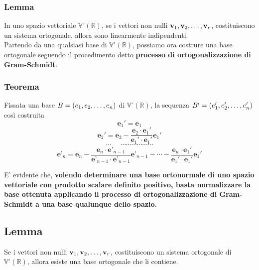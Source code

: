 \documentclass[../main.tex]{subfiles}
\begin{document}
\subsubsection{Lemma}
In uno spazio vettoriale $\mathbb{V}^{\circ}(\mathbb{R})$, se i vettori non
nulli $\textbf{v}_1, \textbf{v}_2, \ldots, \textbf{v}_{r}$, costituiscono un sistema ortogonale, allora sono
linearmente indipendenti.\\ Partendo da una qualsiasi base di
$\mathbb{V}^{\circ}(\mathbb{R})$, possiamo ora costrure una base ortogonale
seguendo il procedimento detto \textbf{processo di ortogonalizzazione di
    Gram-Schmidt}.\\

\subsubsection{Teorema}
Fissata una base $B = (e_1, e_2, \ldots, e_{n})$ di $\mathbb{V}^{\circ}(\mathbb{R})$, la
sequenza $B' = (e'_1, e'_2, \ldots, e'_{n})$ così costruita
\[
    \textbf{e}_1' = \textbf{e}_1
\]
\[
    \textbf{e}_2' = \textbf{e}_2 - \dfrac{\textbf{e}_2\cdot\textbf{e}_1'}{\textbf{e}_1'\cdot\textbf{e}_1'}\textbf{e}_1'
\]
\[
    \cdots \ \ \ \ \ \ \cdots\cdots\cdots\cdots\cdots\cdots
\]
\[
    \textbf{e'}_n = \textbf{e}_n - \dfrac{\textbf{e}_n\cdot\textbf{e'}_{n-1}}{\textbf{e'}_{n-1}\cdot\textbf{e'}_{n-1}}\textbf{e'}_{n-1} - \cdots - \dfrac{\textbf{e}_n\cdot\textbf{e}_1'}{\textbf{e}_1'\cdot\textbf{e}_1'}\textbf{e}_1'
\]

E' evidente che, \textbf{volendo determinare una base ortonormale di uno spazio
    vettoriale con prodotto scalare definito positivo, basta normalizzare la base
    ottenuta applicando il processo di ortogonalizzazione di Gram-Schmidt a una
    base qualunque dello spazio.}

\subsection{Lemma}
Se i vettori non nulli $\textbf{v}_1, \textbf{v}_2, \ldots, \textbf{v}_{r}$, costituiscono un sistema ortogonale
di $\mathbb{V}^{\circ}(\mathbb{R})$, allora esiste una base ortogonale che li
contiene.
\end{document}
